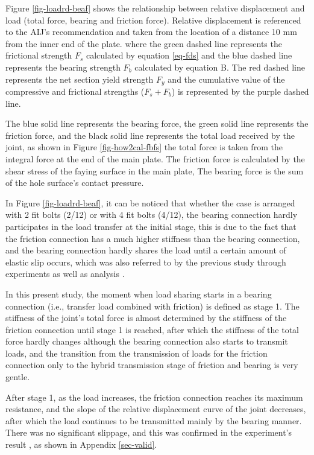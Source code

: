 
Figure \ref{fig-loadrd-beaf} shows the relationship between relative displacement and load (total force, bearing and friction force). Relative displacement is referenced to the AIJ's \cite{AIJ2012AIJStructures} recommendation and taken from the location of a distance 10 mm from the inner end of the plate. where the green dashed line represents the frictional strength $F_s$ calculated by equation \ref{eq-fds} and the blue dashed line represents the bearing strength $F_b$ calculated by equation B. The red dashed line represents the net section yield strength $F_y$ and the cumulative value of the compressive and frictional strengths ($F_s+F_b$) is represented by the purple dashed line.

The blue solid line represents the bearing force, the green solid line represents the friction force, and the black solid line represents the total load received by the joint, as shown in Figure \ref{fig-how2cal-fbfs} the total force is taken from the integral force at the end of the main plate. The friction force is calculated by the shear stress of the faying surface in the main plate, The bearing force is the sum of the hole surface's contact pressure.

In Figure \ref{fig-loadrd-beaf}, it can be noticed that whether the case is arranged with 2 fit bolts (2/12) or with 4 fit bolts (4/12), the bearing connection hardly participates in the load transfer at the initial stage, this is due to the fact that the friction connection has a much higher stiffness than the bearing connection, and the bearing connection hardly shares the load until a certain amount of elastic slip occurs, which was also referred to by the previous study through experiments as well as analysis \cite{fisher1965behavior,chen2023mecha,chen2024Exp}. 

In this present study, the moment when load sharing starts in a bearing connection (i.e., transfer load combined with friction) is defined as stage 1. The stiffness of the joint's total force is almost determined by the stiffness of the friction connection until stage 1 is reached, after which the stiffness of the total force hardly changes although the bearing connection also starts to transmit loads, and the transition from the transmission of loads for the friction connection only to the hybrid transmission stage of friction and bearing is very gentle.

After stage 1, as the load increases, the friction connection reaches its maximum resistance, and the slope of the relative displacement curve of the joint decreases, after which the load continues to be transmitted mainly by the bearing manner. There was no significant slippage, and this was confirmed in the experiment's result \cite{chen2024Exp}, as shown in Appendix \ref{sec-valid}.

